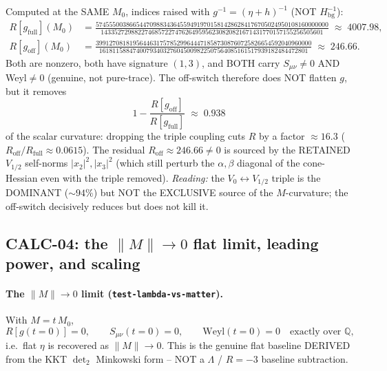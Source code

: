 Computed at the SAME $M_0$, indices raised with $g^{-1}=(\eta+h)^{-1}$ (NOT
$H_{\mathrm{bg}}^{-1}$):
\begin{align}
  R[g_{\mathrm{full}}](M_0) &=
    \frac{574555003866544709883436455949197015814286284176705024950108160000000}
         {143352729882274685722747626495956230820821671431770157155256505601}
    \;\approx\; 4007.98, \\
  R[g_{\mathrm{off}}](M_0) &=
    \frac{3991270818195644631757852996444718587308760725826654592040960000}
         {16181158847400793403276045009822507564085161517939182484472801}
    \;\approx\; 246.66.
\end{align}
Both are nonzero, both have signature $(1,3)$, and BOTH carry $S_{\mu\nu}\neq0$ AND
Weyl$\neq0$ (genuine, not pure-trace). The off-switch therefore does NOT flatten $g$,
but it removes
\begin{equation}
  1 - \frac{R[g_{\mathrm{off}}]}{R[g_{\mathrm{full}}]}
  \;\approx\; 0.938
\end{equation}
of the scalar curvature: dropping the triple coupling cuts $R$ by a factor $\approx16.3$
($R_{\mathrm{off}}/R_{\mathrm{full}}\approx0.0615$). The residual $R_{\mathrm{off}}
\approx246.66\neq0$ is sourced by the RETAINED $V_{1/2}$ self-norms $|x_2|^2,|x_3|^2$
(which still perturb the $\alpha,\beta$ diagonal of the cone-Hessian even with the triple
removed). \emph{Reading:} the $V_0\!\leftrightarrow\!V_{1/2}$ triple is the DOMINANT
($\sim94\%$) but NOT the EXCLUSIVE source of the $M$-curvature; the off-switch decisively
reduces but does not kill it.

\subsection{CALC-04: the $\|M\|\to0$ flat limit, leading power, and scaling}
\label{sec:limit-scaling}

\paragraph{The $\|M\|\to0$ limit (\texttt{test-lambda-vs-matter}).} With $M=t\,M_0$,
\begin{equation}
  R[g(t{=}0)] = 0,\qquad S_{\mu\nu}(t{=}0)=0,\qquad \mathrm{Weyl}(t{=}0)=0
  \quad\text{exactly over }\mathbb{Q},
\end{equation}
i.e.\ flat $\eta$ is recovered as $\|M\|\to0$. This is the genuine flat baseline DERIVED
from the KKT $\det_2$ Minkowski form -- NOT a $\Lambda$ / $R=-3$ baseline subtraction.

